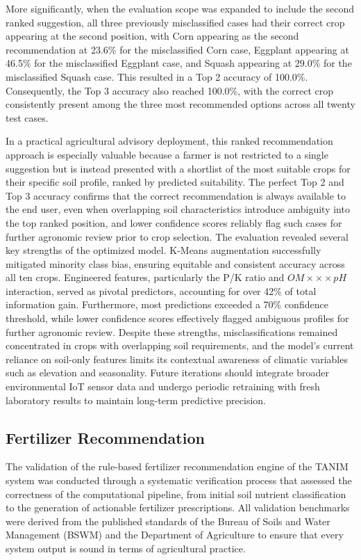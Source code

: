 {	More significantly, when the evaluation scope was expanded to include the second ranked suggestion, all three previously misclassified cases had their correct crop appearing at the second position, with Corn appearing as the second recommendation at 23.6\% for the misclassified Corn case, Eggplant appearing at 46.5\% for the misclassified Eggplant case, and Squash appearing at 29.0\% for the misclassified Squash case. This resulted in a Top 2 accuracy of 100.0\%. Consequently, the Top 3 accuracy also reached 100.0\%, with the correct crop consistently present among the three most recommended options across all twenty test cases.

	In a practical agricultural advisory deployment, this ranked recommendation approach is especially valuable because a farmer is not restricted to a single suggestion but is instead presented with a shortlist of the most suitable crops for their specific soil profile, ranked by predicted suitability. The perfect Top 2 and Top 3 accuracy confirms that the correct recommendation is always available to the end user, even when overlapping soil characteristics introduce ambiguity into the top ranked position, and lower confidence scores reliably flag such cases for further agronomic review prior to crop selection.
	The evaluation revealed several key strengths of the optimized model. K-Means augmentation successfully mitigated minority class bias, ensuring equitable and consistent accuracy across all ten crops. Engineered features, particularly the P/K ratio and $OM×\times
	×pH$ interaction, served as pivotal predictors, accounting for over 42\% of total information gain. Furthermore, most predictions exceeded a 70\% confidence threshold, while lower confidence scores effectively flagged ambiguous profiles for further agronomic review. Despite these strengths, misclassifications remained concentrated in crops with overlapping soil requirements, and the model's current reliance on soil-only features limits its contextual awareness of climatic variables such as elevation and seasonality. Future iterations should integrate broader environmental IoT sensor data and undergo periodic retraining with fresh laboratory results to maintain long-term predictive precision.
	
	\subsection{Fertilizer Recommendation}
	
	The validation of the rule-based fertilizer recommendation engine of the TANIM system was conducted through a systematic verification process that assessed the correctness of the computational pipeline, from initial soil nutrient classification to the generation of actionable fertilizer prescriptions. All validation benchmarks were derived from the published standards of the Bureau of Soils and Water Management (BSWM) and the Department of Agriculture to ensure that every system output is sound in terms of agricultural practice.
	
}
